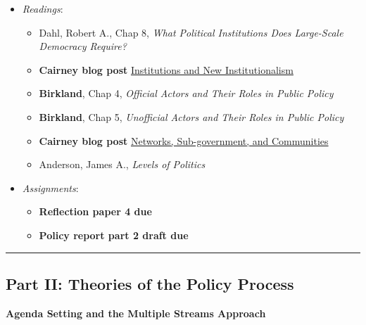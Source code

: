 \begin{itemize}

\item
  \emph{Readings}:

  \begin{itemize}
  
  \item
    Dahl, Robert A., Chap 8, \emph{What Political Institutions Does
    Large-Scale Democracy Require?}
  \item
    \textbf{Cairney blog post}
    \href{https://paulcairney.wordpress.com/2014/03/28/policy-concepts-in-1000-words-institutions-and-new-institutionalism/}{Institutions
    and New Institutionalism}
  \item
    \textbf{Birkland}, Chap 4, \emph{Official Actors and Their Roles in
    Public Policy}
  \item
    \textbf{Birkland}, Chap 5, \emph{Unofficial Actors and Their Roles
    in Public Policy}
  \item
    \textbf{Cairney blog post}
    \href{https://paulcairney.wordpress.com/2014/03/25/policy-concepts-in-1000-words-networks-sub-government-and-communities/}{Networks,
    Sub-government, and Communities}
  \item
    Anderson, James A., \emph{Levels of Politics}
  \end{itemize}
\item
  \emph{Assignments}:

  \begin{itemize}
  
  \item
    \textbf{Reflection paper 4 due}
  \item
    \textbf{Policy report part 2 draft due}
  \end{itemize}
\end{itemize}

\begin{center}\rule{0.5\linewidth}{0.5pt}\end{center}

\hypertarget{part-ii-theories-of-the-policy-process}{%
\subsection{Part II: Theories of the Policy
Process}\label{part-ii-theories-of-the-policy-process}}

\week \textbf{Agenda Setting and the Multiple Streams Approach}

